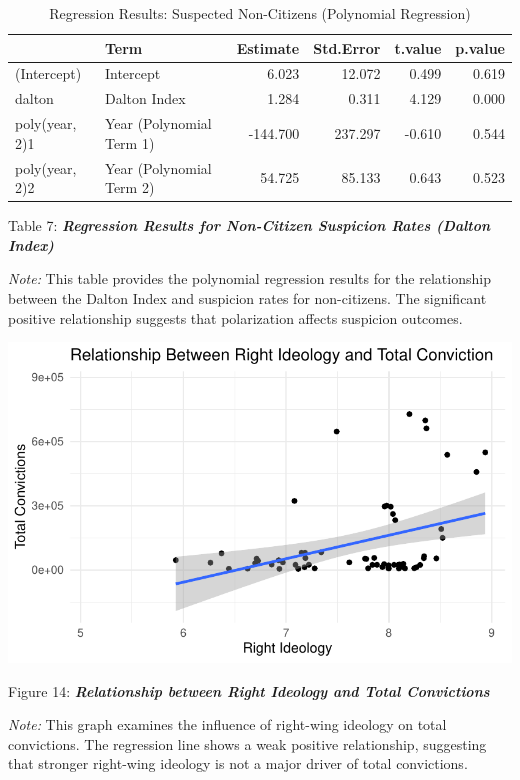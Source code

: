 \documentclass[
]{article}
\begin{document}
\begin{table}
\centering
\caption{Regression Results: Suspected Non-Citizens (Polynomial Regression)}
\centering
\begin{tabular}[t]{l|l|r|r|r|r}
\hline
  & Term & Estimate & Std.Error & t.value & p.value\\
\hline
(Intercept) & Intercept & 6.023 & 12.072 & 0.499 & 0.619\\
\hline
dalton & Dalton Index & 1.284 & 0.311 & 4.129 & 0.000\\
\hline
poly(year, 2)1 & Year (Polynomial Term 1) & -144.700 & 237.297 & -0.610 & 0.544\\
\hline
poly(year, 2)2 & Year (Polynomial Term 2) & 54.725 & 85.133 & 0.643 & 0.523\\
\hline
\end{tabular}
\end{table}

Table 7: \textbf{\emph{Regression Results for Non-Citizen Suspicion
Rates (Dalton Index)}}

\emph{Note:} This table provides the polynomial regression results for
the relationship between the Dalton Index and suspicion rates for
non-citizens. The significant positive relationship suggests that
polarization affects suspicion outcomes.

\includegraphics{DataMan_Project_files/figure-pdf/unnamed-chunk-45-1.pdf}

Figure 14: \textbf{\emph{Relationship between Right Ideology and Total
Convictions}}

\emph{Note:} This graph examines the influence of right-wing ideology on
total convictions. The regression line shows a weak positive
relationship, suggesting that stronger right-wing ideology is not a
major driver of total convictions.
\end{document}
